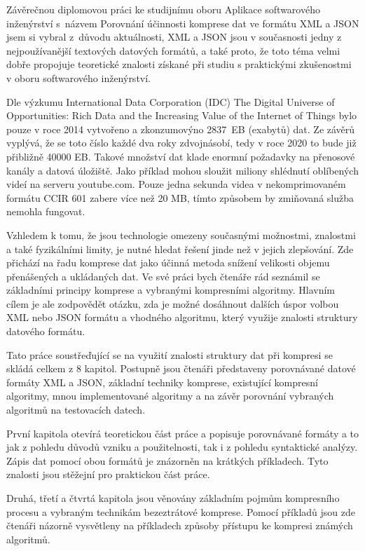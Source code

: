 Závěrečnou diplomovou práci ke studijnímu oboru Aplikace softwarového inženýrství s~ná\-zvem Porovnání účinnosti komprese dat ve formátu XML a JSON jsem si vybral z~důvodu aktuálnosti, XML a JSON jsou v současnosti jedny z nejpoužívanější textových datových formátů, a také proto, že toto téma velmi dobře propojuje teoretické znalosti získané při studiu s praktickými zkušenostmi v oboru softwarového inženýrství.

Dle výzkumu International Data Corporation (IDC) The Digital Universe of Opportunities: Rich Data and the Increasing Value of the Internet of Things \cite{idc} bylo pouze v roce 2014 vytvořeno a zkonzumovýno 2837~EB (exabytů) dat. Ze závěrů vyplývá, že se toto číslo každé dva roky zdvojnásobí, tedy v roce 2020 to bude již přibližně 40000 EB. Takové množství dat klade enormní požadavky na přenosové kanály a datová úložiště. Jako příklad mohou sloužit miliony shlédnutí oblíbených videí na serveru youtube.com. Pouze jedna sekunda videa v nekomprimovaném formátu CCIR 601 zabere více než 20 MB, tímto způsobem by zmiňovaná služba nemohla fungovat.

Vzhledem k tomu, že jsou technologie omezeny současnými možnostmi, znalostmi a také fyzikálními limity, je nutné hledat řešení jinde než v jejich zlepšování. Zde přichází na řadu komprese dat jako účinná metoda snížení velikosti objemu přenášených a ukládaných dat. Ve své práci bych čtenáře rád seznámil se základními principy komprese a vybranými kompresními algoritmy. Hlavním cílem je ale zodpovědět otázku, zda je možné dosáhnout dalších úspor volbou XML nebo JSON formátu a vhodného algoritmu, který využije znalosti struktury datového formátu.

Tato práce soustřeďující se na využití znalosti struktury dat při kompresi se skládá celkem z 8 kapitol. Postupně jsou čtenáři představeny porovnávané datové formáty XML a JSON, základní techniky komprese, existující kompresní algoritmy, mnou implementované algoritmy a na závěr porovnání vybraných algoritmů na testovacích datech.

První kapitola otevírá teoretickou část práce a popisuje porovnávané formáty a to jak z pohledu důvodů vzniku a použitelnosti, tak i z pohledu syntaktické analýzy. Zápis dat pomocí obou formátů je znázorněn na krátkých příkladech. Tyto znalosti jsou stěžejní pro praktickou část práce.

Druhá, třetí a čtvrtá kapitola jsou věnovány základním pojmům kompresního procesu a vybraným technikám bezeztrátové komprese. Pomocí příkladů jsou zde čtenáři názorně vysvětleny na příkladech způsoby přístupu ke kompresi známých algoritmů.

